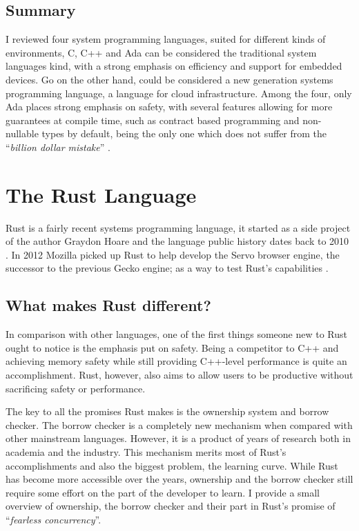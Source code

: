 \subsection{Summary}

I reviewed four system programming languages, suited for different kinds of environments,
C, C++ and Ada can be considered the traditional system languages kind, with a strong emphasis on efficiency
and support for embedded devices.
Go on the other hand, could be considered a new generation systems programming language, a language for cloud infrastructure.
Among the four, only Ada places strong emphasis on safety, with several features allowing for more guarantees at compile time,
such as contract based programming and non-nullable types by default,
being the only one which does not suffer from the “\emph{billion dollar mistake}” \autocite{Hoare2009}.

\section{The Rust Language}\label{sec:rust-lang}

Rust is a fairly recent systems programming language,
it started as a side project of the author Graydon Hoare and the language public history dates back to 2010 \autocite{Hoare2010}.
In 2012 Mozilla picked up Rust to help develop the Servo browser engine, the successor to the previous Gecko engine;
as a way to test Rust's capabilities \autocite{Klabnik2016}.

\subsection{What makes Rust different?}

In comparison with other languages, one of the first things someone new to Rust ought to notice is the emphasis put on safety.
Being a competitor to C++ and achieving memory safety while still providing C++-level performance is quite an accomplishment.
Rust, however, also aims to allow users to be productive without sacrificing safety or performance.

The key to all the promises Rust makes is the ownership system and borrow checker.
The borrow checker is a completely new mechanism when compared with other mainstream languages.
However, it is a product of years of research both in academia and the industry.
This mechanism merits most of Rust's accomplishments and also the biggest problem, the learning curve.
While Rust has become more accessible over the years,
ownership and the borrow checker still require some effort on the part of the developer to learn.
I provide a small overview of ownership, the borrow checker and their part in Rust's promise of “\emph{fearless concurrency}”.


